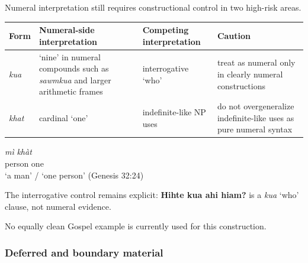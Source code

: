 \documentclass[
  11pt,
  a4paper,
]{article}
\newcounter{none} %
\newcommand{\tdim}[1]{\textit{#1}}
\newcommand{\tdimword}[1]{\textit{#1}}
\newcommand{\glossquote}[1]{`#1'}
\begin{document}
Numeral interpretation still requires constructional control in two
high-risk areas.

{\def\LTcaptype{none} %
\begin{longtable}[]{@{}
  >{\raggedright\arraybackslash}p{}
  >{\raggedright\arraybackslash}p{}
  >{\raggedright\arraybackslash}p{}
  >{\raggedright\arraybackslash}p{}@{}}
\toprule\noalign{}
\begin{minipage}[b]{\linewidth}\raggedright
Form
\end{minipage} & \begin{minipage}[b]{\linewidth}\raggedright
Numeral-side interpretation
\end{minipage} & \begin{minipage}[b]{\linewidth}\raggedright
Competing interpretation
\end{minipage} & \begin{minipage}[b]{\linewidth}\raggedright
Caution
\end{minipage} \\
\midrule\noalign{}
\endhead
\bottomrule\noalign{}
\endlastfoot
\tdim{kua} & \glossquote{nine} in numeral compounds such as
\tdim{sawmkua} and larger arithmetic frames & interrogative
\glossquote{who} & treat as numeral only in clearly numeral
constructions \\
\tdim{khat} & cardinal \glossquote{one} & indefinite-like NP uses & do
not overgeneralize indefinite-like uses as pure numeral syntax \\
\end{longtable}
}

\begin{exe}
\ex \label{ex:num-mi-khat}
\gll \tdimword{mì} \tdimword{khàt} \\
     person one \\
\glt \glossquote{a man} / \glossquote{one person} (Genesis 32:24)
\end{exe}

The interrogative control remains explicit: \textbf{Hihte kua ahi hiam?}
is a \tdim{kua} \glossquote{who} clause, not numeral evidence.

No equally clean Gospel example is currently used for this construction.

\subsubsection{Deferred and boundary
material}\label{deferred-and-boundary-material-2}
\end{document}
